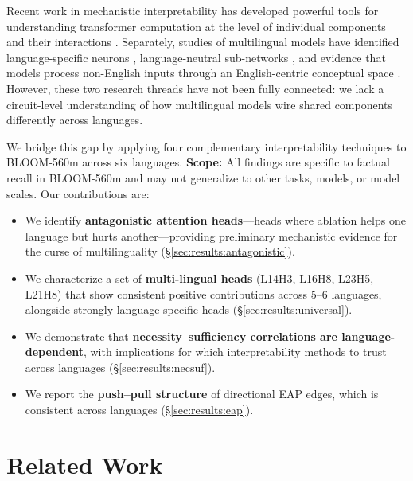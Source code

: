\documentclass[11pt]{article}
\begin{document}
Recent work in mechanistic interpretability has developed powerful tools for understanding transformer computation at the level of individual components and their interactions \cite{elhage2021mathematical, olsson2022incontext, conmy2023towards, anthropic2025circuit}.
Separately, studies of multilingual models have identified language-specific neurons \cite{tang2024language, crane2026causal}, language-neutral sub-networks \cite{foroutan2022discovering}, and evidence that models process non-English inputs through an English-centric conceptual space \cite{wendler2024llamas, schut2025multilingual}.
However, these two research threads have not been fully connected: we lack a circuit-level understanding of how multilingual models wire shared components differently across languages.

We bridge this gap by applying four complementary interpretability techniques to BLOOM-560m \cite{scao2022bloom} across six languages.
\textbf{Scope:} All findings are specific to factual recall in BLOOM-560m and may not generalize to other tasks, models, or model scales.
Our contributions are:

\begin{itemize}
\item We identify \textbf{antagonistic attention heads}---heads where ablation helps one language but hurts another---providing preliminary mechanistic evidence for the curse of multilinguality (\S\ref{sec:results:antagonistic}).
\item We characterize a set of \textbf{multi-lingual heads} (L14H3, L16H8, L23H5, L21H8) that show consistent positive contributions across 5--6 languages, alongside strongly language-specific heads (\S\ref{sec:results:universal}).
\item We demonstrate that \textbf{necessity--sufficiency correlations are language-dependent}, with implications for which interpretability methods to trust across languages (\S\ref{sec:results:necsuf}).
\item We report the \textbf{push--pull structure} of directional EAP edges, which is consistent across languages (\S\ref{sec:results:eap}).
\end{itemize}

\section{Related Work}
\end{document}
